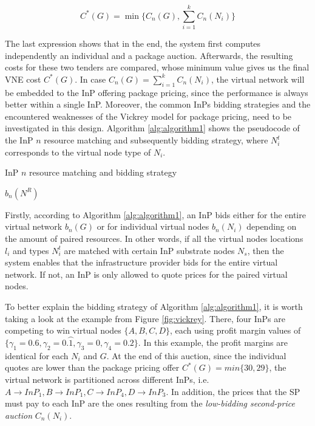   \begin{equation} \label{eq:Cmcost}
        	C^{*}(G) = \min\{C_n(G), \sum_{i=1}^{k} C_n(N_i)\}
  \end{equation}

The last expression shows that in the end, the system first computes independently an individual and a package auction. Afterwards, the resulting costs for these two tenders are compared, whose minimum value gives us the final VNE cost $C^{*}(G)$. In case $C_n(G) = \sum_{i=1}^{k} C_n(N_i)$, the virtual network will be embedded to the InP offering package pricing, since the performance is always better within a single InP. Moreover, the common InPs bidding strategies and the encountered weaknesses of the Vickrey model for package pricing, need to be investigated in this design. Algorithm \ref{alg:algorithm1} shows the pseudocode of the InP $n$ resource matching and subsequently bidding strategy, where $N^{t}_i$ corresponds to the virtual node type of $N_i$.


 \begin{algorithm}
  \caption{InP $n$ resource matching and bidding strategy}
 \label{alg:algorithm1}
  \begin{algorithmic}[1]
 \ELSE
 	 \ENDIF
 	\ENDFOR
 	\State \Return $b_n(N^{R})$
 \ENDIF
 \end{algorithmic}
\end{algorithm}

Firstly, according to Algorithm \ref{alg:algorithm1}, an InP bids either for the entire virtual network $b_n(G)$ or for individual virtual nodes $b_n(N_i)$ depending on the amount of paired resources. In other words, if all the virtual nodes locations $l_{i}$ and types $N^{t}_i$ are matched with certain InP substrate nodes $N_s$, then the system enables that the infrastructure provider bids for the entire virtual network. If not, an InP is only allowed to quote prices for the paired virtual nodes.

To better explain the bidding strategy of Algorithm \ref{alg:algorithm1}, it is worth taking a look at the example from Figure \ref{fig:vickrey}. There, four InPs are competing to win virtual nodes $\{A,B,C,D\}$, each using profit margin values of $\{\gamma_1 = 0.6,\gamma_2 = 0.\wideparen{1},\gamma_3 = 0,\gamma_4 = 0.2\}$. In this example, the profit margins are identical for each $N_i$ and $G$. At the end of this auction, since the individual quotes are lower than the package pricing offer $C^{*}(G) = min\{30, 29\}$, the virtual network is partitioned across different InPs, i.e. $A \rightarrow InP_1, B \rightarrow InP_1, C \rightarrow InP_4, D \rightarrow InP_3$.  In addition, the prices that the SP must pay to each InP are the ones resulting from the \textit{low-bidding second-price auction} $C_n(N_i)$. 

